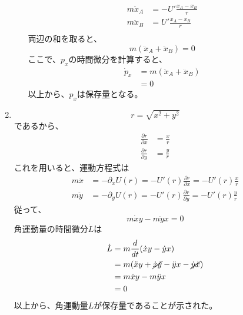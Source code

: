 \documentclass{jsarticle}
\begin{document}
\begin{enumerate}
\begin{enumerate}
                $$
                  \begin{aligned}
                    m\ddot{x}_A & = -U' \frac{x_A - x_B}{r} \\
                    m\ddot{x}_B & = U' \frac{x_A - x_B}{r}  \\
                  \end{aligned}
                $$
                両辺の和を取ると、
                $$
                  m (\ddot{x}_A + \ddot{x}_B) = 0
                $$
                ここで、$p_x$の時間微分を計算すると、
                $$
                  \begin{aligned}
                    \dot{p}_x & = m (\ddot{x}_A+\ddot{x}_B) \\
                              & = 0
                  \end{aligned}
                $$
                以上から、$p_x$は保存量となる。
        \end{enumerate}
  \item
        $$
          r = \sqrt{x^2+y^2}
        $$
        であるから、
        $$
          \begin{aligned}
            \frac{\partial r}{\partial x} & = \frac{x}{r} \\
            \frac{\partial r}{\partial y} & = \frac{y}{r}
          \end{aligned}
        $$
        これを用いると、運動方程式は
        $$
          \begin{aligned}
            m \ddot{x} & = - \partial_x U(r) = -U'(r) \frac{\partial r}{\partial x}= - U'(r) \frac{x}{r} \\
            m \ddot{y} & = - \partial_y U(r) = -U'(r) \frac{\partial r}{\partial y}= - U'(r) \frac{y}{r}
          \end{aligned}
        $$
        従って、
        $$
          m \dot{x} y - m\ddot{y} x = 0
        $$
        角運動量の時間微分$\dot{L}$は
        $$
          \begin{aligned}
            \dot{L} & = m \frac{d}{dt} (\dot{x} y - \dot{y} x)                                         \\
                    & = m (\ddot{x} y + \cancel{\dot{x}\dot{y}} - \ddot{y}x - \cancel{\dot{y}\dot{x}}) \\
                    & = m \ddot{x} y - m \ddot{y} x                                                    \\
                    & =0
          \end{aligned}
        $$
        以上から、角運動量$L$が保存量であることが示された。
\end{enumerate}
\end{document}
